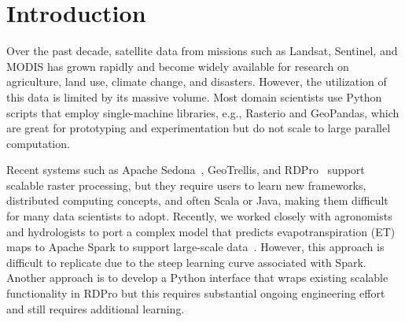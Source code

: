 \section{Introduction}

Over the past decade, satellite data from missions such as Landsat, Sentinel, and MODIS has grown rapidly and become widely available for research on agriculture, land use, climate change, and disasters. However, the utilization of this data is limited by its massive volume. Most domain scientists use Python scripts that employ single-machine libraries, e.g., Rasterio and GeoPandas, which are great for prototyping and experimentation but do not scale to large parallel computation.



Recent systems such as Apache Sedona~\cite{yu2016demonstration}, GeoTrellis, and RDPro~\cite{shang2024rdpro} support scalable raster processing, but they require users to learn new frameworks, distributed computing concepts, and often Scala or Java, making them difficult for many data scientists to adopt. Recently, we worked closely with agronomists and hydrologists to port a complex model that predicts evapotranspiration (ET) maps to Apache Spark to support large-scale data~\cite{FieldSAT}. However, this approach is difficult to replicate due to the steep learning curve associated with Spark. Another approach is to develop a Python interface that wraps existing scalable functionality in RDPro but this requires substantial ongoing engineering effort and still requires additional learning.



